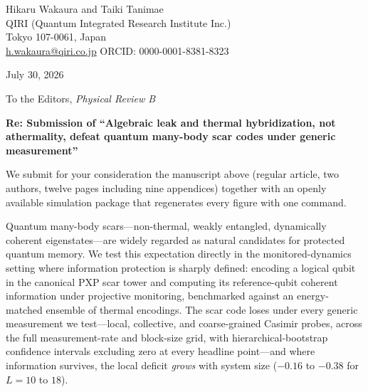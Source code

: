 \documentclass[11pt]{article}
\begin{document}
\pagestyle{empty}

\noindent Hikaru Wakaura and Taiki Tanimae\\
QIRI (Quantum Integrated Research Institute Inc.)\\
Tokyo 107-0061, Japan\\
\href{mailto:h.wakaura@qiri.co.jp}{h.wakaura@qiri.co.jp} \quad ORCID: 0000-0001-8381-8323

\vspace{1em}
\noindent July 30, 2026

\vspace{1em}
\noindent To the Editors, \emph{Physical Review B}

\vspace{1em}

\noindent \textbf{Re: Submission of ``Algebraic leak and thermal hybridization,
not athermality, defeat quantum many-body scar codes under generic
measurement''}

\vspace{0.5em}

We submit for your consideration the manuscript above (regular article, two
authors, twelve pages including nine appendices) together with an openly
available simulation package that regenerates every figure with one command.

\vspace{0.5em}

Quantum many-body scars---non-thermal, weakly entangled, dynamically
coherent eigenstates---are widely regarded as natural candidates for protected
quantum memory. We test this expectation directly in the monitored-dynamics
setting where information protection is sharply defined: encoding a logical
qubit in the canonical PXP scar tower and computing its reference-qubit
coherent information under projective monitoring, benchmarked against an
energy-matched ensemble of thermal encodings. The scar code loses under
every generic measurement we test---local, collective, and coarse-grained
Casimir probes, across the full measurement-rate and block-size grid, with
hierarchical-bootstrap confidence intervals excluding zero at every headline
point---and where information survives, the local deficit \emph{grows} with
system size ($-0.16$ to $-0.38$ for $L=10$ to $18$).
\end{document}
